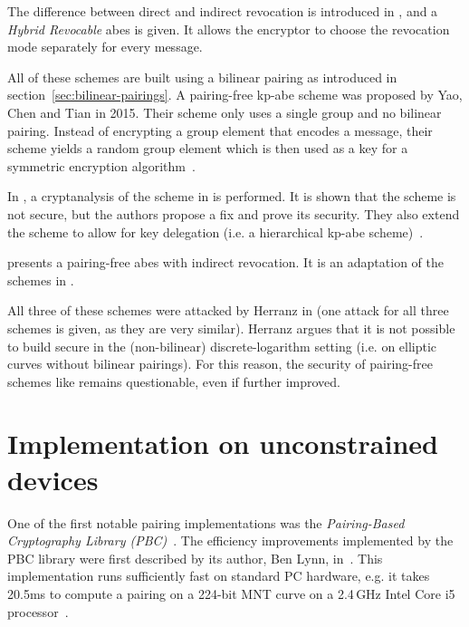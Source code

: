 The difference between direct and indirect revocation is introduced in \cite{attrapadung_attribute-based_2009}, and a \emph{Hybrid Revocable} \acrshort{abes} is given.
It allows the encryptor to choose the revocation mode separately for every message.

All of these schemes are built using a bilinear pairing as introduced in section~\ref{sec:bilinear-pairings}.
A pairing-free \acrshort{kp-abe} scheme was proposed by Yao, Chen and Tian \cite{yao_lightweight_2015} in 2015.
Their scheme only uses a single group and no bilinear pairing.
Instead of encrypting a group element that encodes a message, their scheme yields a random group element which is then used as a key for a symmetric encryption algorithm~\cite{yao_lightweight_2015}.

In \cite{tan_enhancement_2019}, a cryptanalysis of the scheme in \cite{yao_lightweight_2015} is performed.
It is shown that the scheme is not secure, but the authors propose a fix and prove its security.
They also extend the scheme to allow for key delegation (i.e. a hierarchical \acrshort{kp-abe} scheme)~\cite{tan_enhancement_2019}.

\cite{sowjanya_efficient_2020} presents a pairing-free \acrshort{abes} with indirect revocation.
It is an adaptation of the schemes in \cite{yao_lightweight_2015,tan_enhancement_2019}.

All three of these schemes were attacked by Herranz in \cite{herranz_attacking_2020} (one attack for all three schemes is given, as they are very similar).
Herranz argues that it is not possible to build secure  in the (non-bilinear) discrete-logarithm setting (i.e. on elliptic curves without bilinear pairings).
For this reason, the security of pairing-free schemes like \cite{yao_lightweight_2015,sowjanya_efficient_2020,tan_enhancement_2019} remains questionable, even if further improved.

\section{Implementation on unconstrained devices}
One of the first notable pairing implementations was the \emph{Pairing-Based Cryptography Library (PBC)}~\cite{lynn_pairing-based_nodate, lynn_implementation_2007}.
The efficiency improvements implemented by the PBC library were first described by its author, Ben Lynn, in~\cite{lynn_implementation_2007}.
This implementation runs sufficiently fast on standard PC hardware, e.g. it takes 20.5ms to compute a pairing on a 224-bit MNT curve on a 2.4\,GHz Intel Core i5 processor~\cite{akinyele_self-protecting_2010}.

